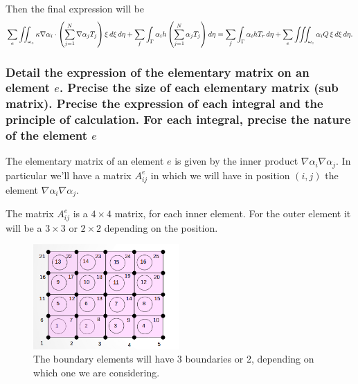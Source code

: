 Then the final expression will be
\begin{align*}
\sum_e\iint_{\omega_e}\kappa\nabla\alpha_i\cdot\left(\sum_{j=1}^{N}\nabla\alpha_jT_j \right) \xi\mathop{}\!d\xi\mathop{}\!d\eta +\sum_f\int_{\Gamma}\alpha_ih\left(\sum_{j=1}^{N}\alpha_jT_j\right)\mathop{}\!d \eta=
\sum_f\int_{\Gamma}\alpha_ihT_r\mathop{}\!d \eta+\sum_e\iiint_{\omega_e}\alpha_iQ\,\xi\mathop{}\!d\xi\mathop{}\!d\eta.
\end{align*}


\subsubsection{Detail the expression of the elementary matrix on an element $ e $. Precise the size of each elementary matrix (sub matrix). Precise the expression of each integral and the principle of calculation. For each integral, precise the nature of the element $ e $} 

The elementary matrix of an element $ e $ is given by the inner product $ \nabla\alpha_i\nabla\alpha_j $. In particular we'll have a matrix $ A_{ij}^e $ in which we will have in position $ (i,j) $ the element $ \nabla\alpha_i\nabla\alpha_j $. 


The matrix $ A_{ij}^e $ is a $ 4\times4 $ matrix, for each inner element. For the outer element it will be a $ 3\times3 $ or $ 2\times2 $ depending on the position. 
\begin{figure}
	\centering
	\includegraphics[height=4cm]{Images/mesh.png}
	\caption{The boundary elements will have 3 boundaries or 2, depending on which one we are considering.}
\end{figure}

